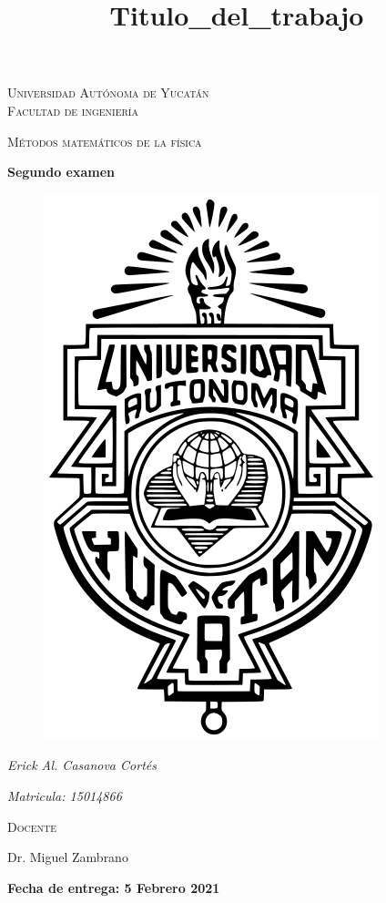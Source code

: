 \documentclass[11pt]{report}
\theoremstyle{plain}
\theoremstyle{definition}
\begin{document}
\begin{titlepage}
\title{Titulo_del_trabajo}


	\centering
	{\scshape\LARGE Universidad Autónoma de Yucatán  \\ Facultad de ingeniería\par}
	\vspace{1cm}
	{\scshape\Large Métodos matemáticos de la física\par}
	\vspace{1.5cm}
	{\huge\bfseries Segundo examen\par}
	\vspace{0.7cm}
	{\begin{figure}[!h]
	\centering
    \includegraphics[scale=0.3]{UADY.png}
	\end{figure}}
	\vspace{0.7cm}
	{\Large\itshape Erick Al. Casanova Cortés\par}
	{\Large\itshape Matricula: 15014866\par}
	\vfill
	{\scshape\Large Docente\par
	Dr. Miguel Zambrano\par}
	\vfill
	{\Large{\bfseries Fecha de entrega: 5 Febrero 2021} }

	\vfill
	
\end{titlepage}
\end{document}
